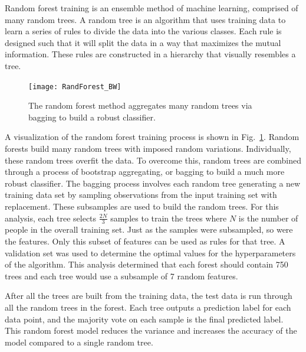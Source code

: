 \documentclass[10pt,twocolumn,conference]{IEEEtran}
\begin{document}
Random forest training is an ensemble method of machine learning, comprised of many random trees.
A random tree is an algorithm that uses training data to learn a series of rules to divide the data into the various classes.
Each rule is designed such that it will split the data in a way that maximizes the mutual information.
These rules are constructed in a hierarchy that visually resembles a tree.


\begin{figure}[t]
	\centering
	\texttt{[image: RandForest\_BW]}
	\caption{The random forest method aggregates many random trees via bagging to build a robust classifier.}
	\label{fig:rand_forest}
\end{figure}  


A visualization of the random forest training process is shown in Fig.~\ref{fig:rand_forest}.
Random forests build many random trees with imposed random variations.
Individually, these random trees overfit the data.
To overcome this, random trees are combined through a process of bootstrap aggregating, or bagging to build a much more robust classifier.
The bagging process involves each random tree generating a new training data set by sampling observations from the input training set with replacement.
These subsamples are used to build the random trees.
For this analysis, each tree selects $\frac{2N}{3}$ samples to train the trees where $N$ is the number of people in the overall training set.
Just as the samples were subsampled, so were the features.
Only this subset of features can be used as rules for that tree.
A validation set was used to determine the optimal values for the hyperparameters of the algorithm.
This analysis determined that each forest should contain 750 trees and each tree would use a subsample of 7 random features.

After all the trees are built from the training data, the test data is run through all the random trees in the forest.
Each tree outputs a prediction label for each data point, and the majority vote on each sample is the final predicted label.
This random forest model reduces the variance and increases the accuracy of the model compared to a single random tree.
\end{document}
